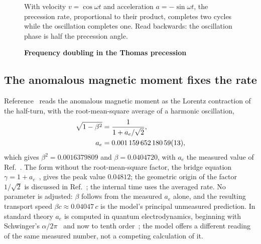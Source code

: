 \documentclass[%
 reprint, amsmath,amssymb, aps, prb, ]{revtex4-2}
\numberwithin{equation}{section}
\begin{document}
\begin{figure}[t!]
\centering
{}
\caption{\textbf{Frequency doubling in the Thomas precession}}
\label{fig:thomas}
\vspace{0.4em}
\begin{minipage}{0.95\columnwidth}
\justifying\small
With velocity $v=\cos\omega t$ and acceleration $a=-\sin\omega t$, the precession rate, proportional to their product, completes two cycles while the oscillation completes one. Read backwards: the oscillation phase is half the precession angle.
\end{minipage}
\end{figure}

\subsection{The anomalous magnetic moment fixes the rate}

Reference~\cite{ref:p10} reads the anomalous magnetic moment as the Lorentz contraction of the half-turn, with the root-mean-square average of a harmonic oscillation,
\begin{align}
\sqrt{1-\beta^2}&=\frac{1}{1+a_e/\sqrt2},
\label{eq:beta}\\
a_e&=0.001\,159\,652\,180\,59(13),
\notag
\end{align}
which gives $\beta^2=0.0016379809$ and $\beta=0.0404720$, with $a_e$ the measured value of Ref.~\cite{ref:fan23}. The form without the root-mean-square factor, the bridge equation $\gamma=1+a_e$~\cite{ref:p15,ref:p62}, gives the peak value $0.04812$; the geometric origin of the factor $1/\sqrt2$ is discussed in Ref.~\cite{ref:p62}; the internal time uses the averaged rate. No parameter is adjusted: $\beta$ follows from the measured $a_e$ alone, and the resulting transport speed $\beta c\approx0.04047\,c$ is the model's principal unmeasured prediction. In standard theory $a_e$ is computed in quantum electrodynamics, beginning with Schwinger's $\alpha/2\pi$~\cite{ref:schwinger} and now to tenth order~\cite{ref:aoyama}; the model offers a different reading of the same measured number, not a competing calculation of it.
\end{document}
